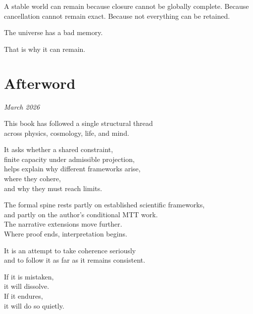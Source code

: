\documentclass[11pt,twoside,openright]{book}
\newcommand{\BlockParagraphStyle}{%
  \setlength{\parindent}{0pt}%
  \setlength{\parskip}{5pt plus 1pt minus 1pt}%
}
\begin{document}
A stable world can remain because closure cannot be globally complete. Because cancellation cannot remain exact. Because not everything can be retained.

\bigskip

The universe has a bad memory.

That is why it can remain.

\backmatter
\BlockParagraphStyle

\chapter*{Afterword}

\begin{flushright}
\textit{March 2026}
\end{flushright}

\vspace{1em}

\begingroup
\setlength{\parindent}{0pt}

\bigskip

This book has followed a single structural thread\\
across physics, cosmology, life, and mind.

\bigskip

It asks whether a shared constraint,\\
finite capacity under admissible projection,\\
helps explain why different frameworks arise,\\
where they cohere,\\
and why they must reach limits.

\bigskip

The formal spine rests partly on established scientific frameworks,\\
and partly on the author's conditional MTT work.\\
The narrative extensions move further.\\
Where proof ends, interpretation begins.

\bigskip

It is an attempt to take coherence seriously\\
and to follow it as far as it remains consistent.

\bigskip

If it is mistaken,\\
it will dissolve.\\
If it endures,\\
it will do so quietly.
\end{document}
